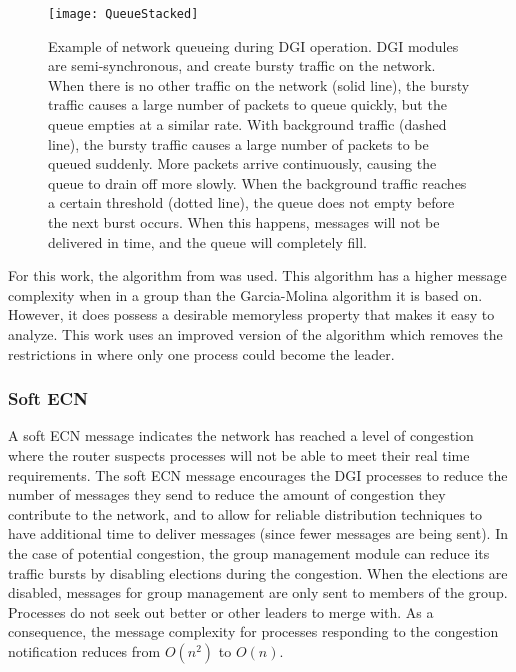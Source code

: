\begin{figure}
\centering
\texttt{[image: QueueStacked]}
\caption{
Example of network queueing during \ac{DGI} operation. \ac{DGI} modules are semi-synchronous, and create bursty traffic on the network.
When there is no other traffic on the network (solid line), the bursty traffic causes a large number of packets to queue quickly, but the queue empties at a similar rate.
With background traffic (dashed line), the bursty traffic causes a large number of packets to be queued suddenly. More packets arrive continuously, causing the queue to drain off more slowly.
When the background traffic reaches a certain threshold (dotted line), the queue does not empty before the next burst occurs. When this happens, messages will not be delivered in time, and the queue will completely fill.
}
\label{fig:queue-types}
\end{figure}

For this work, the algorithm from \cite{JOURNAL} was used.
This algorithm has a higher message complexity when in a group than the Garcia-Molina algorithm it is based on.
However, it does possess a desirable memoryless property that makes it easy to analyze.
This work uses an improved version of the algorithm which removes the restrictions in \cite{JOURNAL} where only one process could become the leader.

\subsubsection{Soft \ac{ECN}}

A soft \ac{ECN} message indicates the network has reached a level of congestion where the router suspects processes will not be able to meet their real time requirements.
The soft \ac{ECN} message encourages the \ac{DGI} processes to reduce the number of messages they send to reduce the amount of congestion they contribute to the network, and to allow for reliable distribution techniques to have additional time to deliver messages (since fewer messages are being sent).
In the case of potential congestion, the group management module can reduce its traffic bursts by disabling elections during the congestion.
When the elections are disabled, messages for group management are only sent to members of the group.
Processes do not seek out better or other leaders to merge with.
As a consequence, the message complexity for processes responding to the congestion notification reduces from $O(n^2)$ to $O(n)$.

